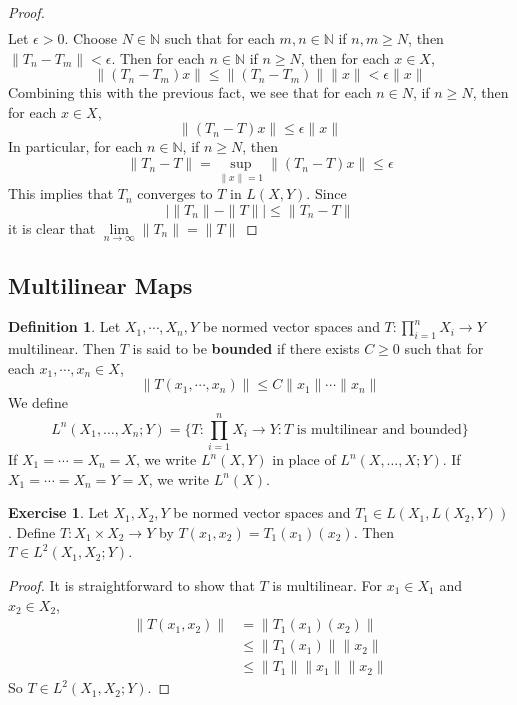 \documentclass[12pt]{amsart}
\theoremstyle{definition}
\newtheorem{defn}[definition]{Definition}
\newtheorem{ex}[definition]{Exercise}
\newcommand{\ep}{\epsilon}
\newcommand{\N}{\mathbb{N}}
\newcommand{\limn}{\lim \limits_{n \rightarrow \infty}}
\begin{document}
\begin{proof}
\begin{align*}
		\end{align*} 
		Let $\ep >0 $. Choose $N \in \N$ such that for each $m, n \in \N$ if $n,m \geq N$, then $\|T_n - T_m \|< \ep$. Then for each $n \in \N$ if $n \geq N$, then for each $x \in X$, $$\|(T_n-T_m)x\|\leq \|(T_n-T_m)\|\|x \|< \ep \|x\|$$ Combining this with the previous fact, we see that for each $n \in N$, if $n \geq N$, then for each $x \in X$, $$\|(T_n -T) x\|\leq \ep \|x \|$$ In particular, for each $n \in \N$, if $n \geq N$, then $$ \|T_n -T \|= \sup\limits_{\|x \|= 1}\|(T_n - T)x \|\leq \ep$$ This implies that $T_n$ converges to $T$ in $L(X,Y)$. 
		Since $$\big\vert \|T_n \|- \|T \|\big \vert \leq \|T_n - T \|$$ it is clear that $\limn \|T_n \|= \|T \|$
	\end{proof}
	
	
	
	
	
	
	
	
	
	
	
	
	
	
	\newpage
	\subsection{Multilinear Maps}	
	\begin{defn}
	Let $X_1, \cdots, X_n, Y$ be normed vector spaces and $T: \prod\limits_{i=1}^n X_i \rightarrow Y$ multilinear. Then $T$ is said to be \textbf{bounded} if there exists $C \geq 0$ such that for each $x_1, \cdots, x_n \in X$, $$\|T(x_1, \cdots, x_n)\| \leq C \|x_1\| \cdots \|x_n\|$$
	We define $$L^n (X_1, \dots, X_n; Y) = \bigg\{T: \prod\limits_{i=1}^n X_i \rightarrow Y: T \text{ is multilinear and bounded}\bigg \}$$ 
	If $X_1 = \cdots = X_n = X$, we write $L^n(X,Y)$ in place of $L^n (X, \dots, X; Y) $. If $X_1 = \cdots = X_n = Y =  X$, we write $L^n(X)$.
	\end{defn}
	
	\begin{ex}
	Let $X_1, X_2, Y$ be normed vector spaces and $T_1 \in L(X_1, L(X_2, Y))$. Define $T:X_1 \times X_2 \rightarrow Y$ by $T(x_1, x_2) = T_1(x_1)(x_2)$. Then $T \in L^2(X_1, X_2; Y)$.  
	\end{ex}
	
	\begin{proof}
	It is straightforward to show that $T$ is multilinear. For $x_1 \in X_1$ and $x_2 \in X_2$, 
	\begin{align*}
	\|T(x_1, x_2)\| 
	&= \|T_1(x_1)(x_2)\| \\
	& \leq \|T_1(x_1)\| \|x_2\| \\
	& \leq \|T_1\| \|x_1\| \|x_2\|
	\end{align*}
	So $T \in L^2(X_1, X_2;Y)$.
	\end{proof}
	
\end{document}
